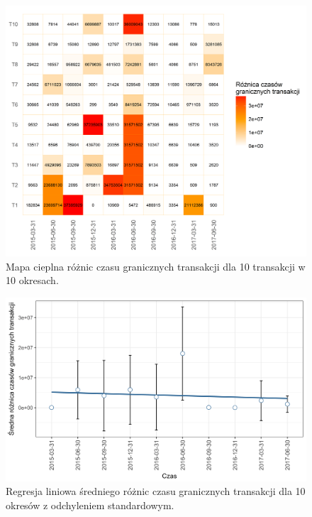 \documentclass[12pt, twoside, final, openany]{mgr}
\newcommand{\chartsWidth}{0.8}
\begin{document}
\begin{figure}[H]
\centering
   \includegraphics[width=\chartsWidth\linewidth]{pictures/czas_graniczny/czas_graniczny_hm.png}
   \caption{Mapa cieplna różnic czasu  granicznych transakcji dla 10 transakcji w 10 okresach.}
   \label{fig:cg1} 
\end{figure}

\begin{figure}[H]
\centering
   \includegraphics[width=\chartsWidth\linewidth]{pictures/czas_graniczny/czas_graniczny_sda.png}
   \caption{Regresja liniowa średniego różnic czasu granicznych transakcji dla 10 okresów z odchyleniem standardowym.}
   \label{fig:cg2}
\end{figure}

\newpage
\end{document}
